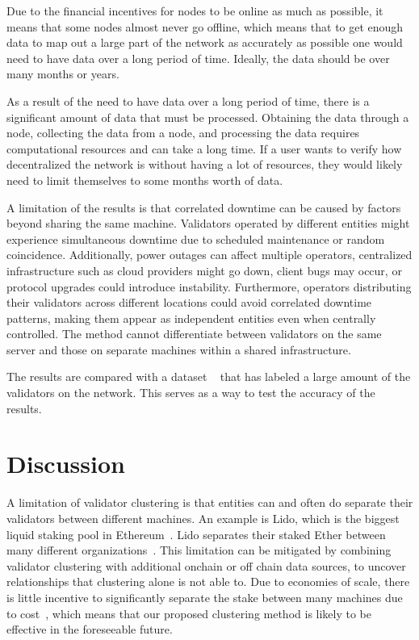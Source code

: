 \documentclass[runningheads]{llncs}
\begin{document}
Due to the financial incentives for nodes to be online as much as possible, it means that some nodes almost never go offline, which means that to get enough data to map out a large part of the network as accurately as possible one would need to have data over a long period of time. Ideally, the data should be over many months or years. 

As a result of the need to have data over a long period of time, there is a significant amount of data that must be processed. Obtaining the data through a node, collecting the data from a node, and processing the data requires computational resources and can take a long time. If a user wants to verify how decentralized the network is without having a lot of resources, they would likely need to limit themselves to some months worth of data. 

A limitation of the results is that correlated downtime can be caused by factors beyond sharing the same machine. Validators operated by different entities might experience simultaneous downtime due to scheduled maintenance or random coincidence. Additionally, power outages can affect multiple operators, centralized infrastructure such as cloud providers might go down, client bugs may occur, or protocol upgrades could introduce instability. Furthermore, operators distributing their validators across different locations could avoid correlated downtime patterns, making them appear as independent entities even when centrally controlled. The method cannot differentiate between validators on the same server and those on separate machines within a shared infrastructure. 

The results are compared with a dataset ~\cite{eip7716_2024_vitalikethresear} that has labeled a large amount of the validators on the network. This serves as a way to test the accuracy of the results. 

\section{Discussion}

A limitation of validator clustering is that entities can and often do separate their validators between different machines.
An example is Lido, which is the biggest liquid staking pool in Ethereum~\cite{rated2025}.
Lido separates their staked Ether between many different organizations~\cite{vanom_lido2025}.
This limitation can be mitigated by combining validator clustering with additional onchain or off chain data sources, to uncover relationships that clustering alone is not able to. 
Due to economies of scale, there is little incentive to significantly separate the stake between many machines due to cost~\cite{eip7716_2024_ethresear}, which means that our proposed clustering method is likely to be effective in the foreseeable future.
\end{document}
